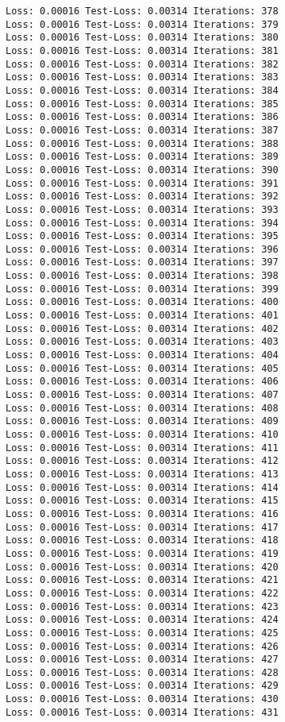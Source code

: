 \documentclass[11pt]{article}
\begin{document}
\begin{Verbatim}[commandchars=\\\{\}]
Loss: 0.00016 Test-Loss: 0.00314 Iterations: 378
Loss: 0.00016 Test-Loss: 0.00314 Iterations: 379
Loss: 0.00016 Test-Loss: 0.00314 Iterations: 380
Loss: 0.00016 Test-Loss: 0.00314 Iterations: 381
Loss: 0.00016 Test-Loss: 0.00314 Iterations: 382
Loss: 0.00016 Test-Loss: 0.00314 Iterations: 383
Loss: 0.00016 Test-Loss: 0.00314 Iterations: 384
Loss: 0.00016 Test-Loss: 0.00314 Iterations: 385
Loss: 0.00016 Test-Loss: 0.00314 Iterations: 386
Loss: 0.00016 Test-Loss: 0.00314 Iterations: 387
Loss: 0.00016 Test-Loss: 0.00314 Iterations: 388
Loss: 0.00016 Test-Loss: 0.00314 Iterations: 389
Loss: 0.00016 Test-Loss: 0.00314 Iterations: 390
Loss: 0.00016 Test-Loss: 0.00314 Iterations: 391
Loss: 0.00016 Test-Loss: 0.00314 Iterations: 392
Loss: 0.00016 Test-Loss: 0.00314 Iterations: 393
Loss: 0.00016 Test-Loss: 0.00314 Iterations: 394
Loss: 0.00016 Test-Loss: 0.00314 Iterations: 395
Loss: 0.00016 Test-Loss: 0.00314 Iterations: 396
Loss: 0.00016 Test-Loss: 0.00314 Iterations: 397
Loss: 0.00016 Test-Loss: 0.00314 Iterations: 398
Loss: 0.00016 Test-Loss: 0.00314 Iterations: 399
Loss: 0.00016 Test-Loss: 0.00314 Iterations: 400
Loss: 0.00016 Test-Loss: 0.00314 Iterations: 401
Loss: 0.00016 Test-Loss: 0.00314 Iterations: 402
Loss: 0.00016 Test-Loss: 0.00314 Iterations: 403
Loss: 0.00016 Test-Loss: 0.00314 Iterations: 404
Loss: 0.00016 Test-Loss: 0.00314 Iterations: 405
Loss: 0.00016 Test-Loss: 0.00314 Iterations: 406
Loss: 0.00016 Test-Loss: 0.00314 Iterations: 407
Loss: 0.00016 Test-Loss: 0.00314 Iterations: 408
Loss: 0.00016 Test-Loss: 0.00314 Iterations: 409
Loss: 0.00016 Test-Loss: 0.00314 Iterations: 410
Loss: 0.00016 Test-Loss: 0.00314 Iterations: 411
Loss: 0.00016 Test-Loss: 0.00314 Iterations: 412
Loss: 0.00016 Test-Loss: 0.00314 Iterations: 413
Loss: 0.00016 Test-Loss: 0.00314 Iterations: 414
Loss: 0.00016 Test-Loss: 0.00314 Iterations: 415
Loss: 0.00016 Test-Loss: 0.00314 Iterations: 416
Loss: 0.00016 Test-Loss: 0.00314 Iterations: 417
Loss: 0.00016 Test-Loss: 0.00314 Iterations: 418
Loss: 0.00016 Test-Loss: 0.00314 Iterations: 419
Loss: 0.00016 Test-Loss: 0.00314 Iterations: 420
Loss: 0.00016 Test-Loss: 0.00314 Iterations: 421
Loss: 0.00016 Test-Loss: 0.00314 Iterations: 422
Loss: 0.00016 Test-Loss: 0.00314 Iterations: 423
Loss: 0.00016 Test-Loss: 0.00314 Iterations: 424
Loss: 0.00016 Test-Loss: 0.00314 Iterations: 425
Loss: 0.00016 Test-Loss: 0.00314 Iterations: 426
Loss: 0.00016 Test-Loss: 0.00314 Iterations: 427
Loss: 0.00016 Test-Loss: 0.00314 Iterations: 428
Loss: 0.00016 Test-Loss: 0.00314 Iterations: 429
Loss: 0.00016 Test-Loss: 0.00314 Iterations: 430
Loss: 0.00016 Test-Loss: 0.00314 Iterations: 431

\end{Verbatim}
\end{document}
